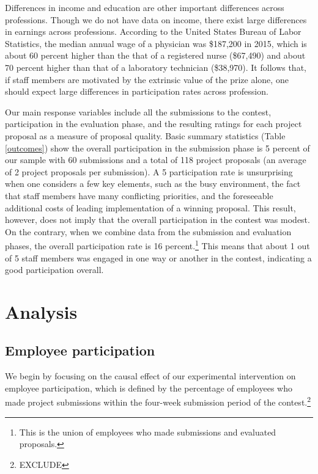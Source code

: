 \documentclass[11pt, titlepage]{article}
\begin{document}
Differences in income and education are other important differences
across professions. Though we do not have data on income, there exist
large differences in earnings across professions. According to the
United States Bureau of Labor Statistics, the median annual wage of a
physician was \$187,200 in 2015, which is about 60 percent higher than
the that of a registered nurse (\$67,490) and about 70 percent higher
than that of a laboratory technician (\$38,970). It follows that, if
staff members are motivated by the extrinsic value of the prize alone,
one should expect large differences in participation rates across
profession.

Our main response variables include all the submissions to the contest,
participation in the evaluation phase, and the resulting ratings for
each project proposal as a measure of proposal quality. Basic summary
statistics (Table \ref{outcomes}) show the overall participation in the
submission phase is 5 percent of our sample with 60 submissions and a
total of 118 project proposals (an average of 2 project proposals per
submission). A 5 participation rate is unsurprising when one considers a
few key elements, such as the busy environment, the fact that staff
members have many conflicting priorities, and the foreseeable additional
costs of leading implementation of a winning proposal. This result,
however, does not imply that the overall participation in the contest
was modest. On the contrary, when we combine data from the submission
and evaluation phases, the overall participation rate is 16
percent.\footnote{This is the union of employees who made submissions
  and evaluated proposals.} This means that about 1 out of 5 staff
members was engaged in one way or another in the contest, indicating a
good participation overall.



\section{Analysis}\label{analysis}

\subsection{Employee participation}\label{employee-participation}

We begin by focusing on the causal effect of our experimental
intervention on employee participation, which is defined by the
percentage of employees who made project submissions within the
four-week submission period of the contest.\footnote{EXCLUDE}
\end{document}

